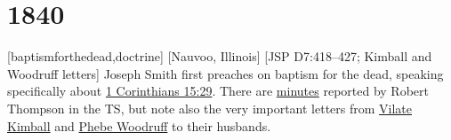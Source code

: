 \section{1840} %


	
	[baptismforthedead,doctrine]
	[Nauvoo, Illinois] %
	[JSP D7:418--427; Kimball and Woodruff letters] %
	{Joseph Smith first preaches on baptism for the dead, speaking specifically about \hyperref[1CORINTHIANS-15-29]{1 Corinthians 15:29}. There are \hyperref[EMS-1840-JS-3-5-OCT-1840-RT]{minutes} reported by Robert Thompson in the TS, but note also the very important letters from \hyperref[EMS-1840-JS-3-5-OCT-1840-VK]{Vilate Kimball} and \hyperref[EMS-1840-JS-3-5-OCT-1840-PW]{Phebe Woodruff} to their husbands.} %
	





